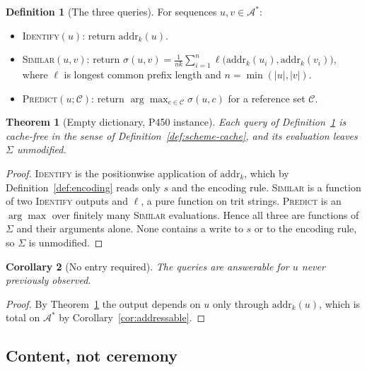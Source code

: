 \documentclass[11pt,twocolumn,a4paper]{article}
\newcommand{\Scoord}{s}
\newcommand{\addr}{\mathrm{addr}}
\newcommand{\Res}{\mathcal{A}}
\newcommand{\Sch}{\Sigma}
\theoremstyle{plain}
\newtheorem{theorem}{Theorem}
\newtheorem{corollary}[theorem]{Corollary}
\theoremstyle{definition}
\newtheorem{definition}{Definition}
\theoremstyle{remark}
\begin{document}
\begin{definition}[The three queries]
\label{def:queries}
For sequences $u, v \in \Res^{*}$:
\begin{itemize}
  \item \textsc{Identify}$(u)$: return $\addr_{k}(u)$.
  \item \textsc{Similar}$(u,v)$: return
    $\sigma(u,v) = \frac{1}{nk}\sum_{i=1}^{n} \ell\bigl(\addr_{k}(u_{i}),
    \addr_{k}(v_{i})\bigr)$, where $\ell$ is longest common prefix length
    and $n = \min(|u|,|v|)$.
  \item \textsc{Predict}$(u; \mathcal{C})$: return
    $\arg\max_{c \in \mathcal{C}} \sigma(u,c)$ for a reference set
    $\mathcal{C}$.
\end{itemize}
\end{definition}

\begin{theorem}[Empty dictionary, P450 instance]
\label{thm:empty}
Each query of Definition~\ref{def:queries} is cache-free in the sense of
Definition~\ref{def:scheme-cache}, and its evaluation leaves $\Sch$
unmodified.
\end{theorem}

\begin{proof}
\textsc{Identify} is the positionwise application of $\addr_{k}$, which by
Definition~\ref{def:encoding} reads only $\Scoord$ and the encoding rule.
\textsc{Similar} is a function of two \textsc{Identify} outputs and $\ell$,
a pure function on trit strings. \textsc{Predict} is an $\arg\max$ over
finitely many \textsc{Similar} evaluations. Hence all three are functions of
$\Sch$ and their arguments alone. None contains a write to $\Scoord$ or to
the encoding rule, so $\Sch$ is unmodified.
\end{proof}

\begin{corollary}[No entry required]
\label{cor:no-entry}
The queries are answerable for $u$ never previously observed.
\end{corollary}

\begin{proof}
By Theorem~\ref{thm:empty} the output depends on $u$ only through
$\addr_{k}(u)$, which is total on $\Res^{*}$ by
Corollary~\ref{cor:addressable}.
\end{proof}

\subsection{Content, not ceremony}
\label{sec:content}
\end{document}
